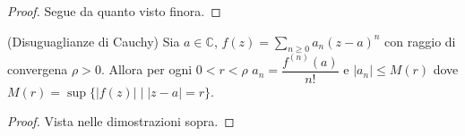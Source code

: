 \begin{proof}
  Segue da quanto visto finora.
\end{proof}

\begin{cor}
  (Disuguaglianze di Cauchy) Sia $a \in \mathbb{C}$, $\displaystyle f(z)=\sum_{n \ge 0} a_n(z-a)^n$ con raggio di convergena $\rho>0$. Allora per ogni $0 <r<\rho$ $a_n=\dfrac{f^{(n)}(a)}{n!}$ e $|a_n| \le M(r)$ dove $M(r)=\sup\{|f(z)| \mid |z-a|=r\}$.
\end{cor}

\begin{proof}
  Vista nelle dimostrazioni sopra.
\end{proof}
